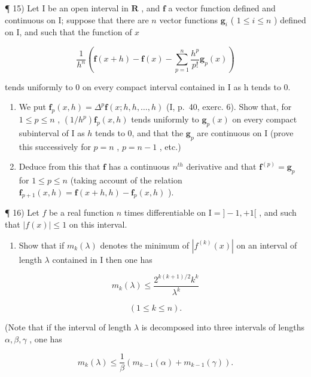 ¶ 15) Let I be an open interval in \(\mathbf{R}\) , and \(\mathbf{f}\) a vector function defined and continuous on I; suppose that there are \(n\) vector functions \(\mathbf{g}_i\) ( \(1 \leqslant i \leqslant n\) ) defined on I, and such that the function of \(x\)

\[
\frac {1}{h ^ {n}} \left(\mathbf {f} (x + h) - \mathbf {f} (x) - \sum_ {p = 1} ^ {n} \frac {h ^ {p}}{p !} \mathbf {g} _ {p} (x)\right)
\]

tends uniformly to 0 on every compact interval contained in I as h tends to 0.

\begin{enumerate}
\def\labelenumi{\alph{enumi})}
\item
  We put \(\mathbf{f}_p(x,h) = \Delta^p\mathbf{f}(x;h,h,\ldots ,h)\) (I, p.~40, exerc. 6). Show that, for \(1\leqslant p\leqslant n\) , \((1 / h^{p})\mathbf{f}_{p}(x,h)\) tends uniformly to \(\mathbf{g}_p(x)\) on every compact subinterval of I as \(h\) tends to 0, and that the \(\mathbf{g}_p\) are continuous on I (prove this successively for \(p = n\) , \(p = n - 1\) , etc.)
\item
  Deduce from this that \(\mathbf{f}\) has a continuous \(n^{th}\) derivative and that \(\mathbf{f}^{(p)} = \mathbf{g}_p\) for \(1 \leqslant p \leqslant n\) (taking account of the relation \(\mathbf{f}_{p+1}(x, h) = \mathbf{f}(x + h, h) - \mathbf{f}_p(x, h)\) ).
\end{enumerate}

¶ 16) Let \(f\) be a real function \(n\) times differentiable on \(\mathrm{I} = ] - 1, + 1[\) , and such that \(|f(x)|\leqslant 1\) on this interval.

\begin{enumerate}
\def\labelenumi{\alph{enumi})}
\tightlist
\item
  Show that if \(m_k(\lambda)\) denotes the minimum of \(|f^{(k)}(x)|\) on an interval of length \(\lambda\) contained in I then one has
\end{enumerate}

\[
m _ {k} (\lambda) \leqslant \frac {2 ^ {k (k + 1) / 2} k ^ {k}}{\lambda^ {k}}
\]

\[
(1 \leqslant k \leqslant n).
\]

(Note that if the interval of length \(\lambda\) is decomposed into three intervals of lengths \(\alpha, \beta, \gamma\) , one has

\[
m _ {k} (\lambda) \leqslant \frac {1}{\beta} (m _ {k - 1} (\alpha) + m _ {k - 1} (\gamma)).
\]

